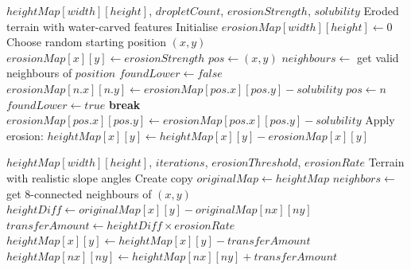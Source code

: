\documentclass[12pt,a4paper]{report}
\begin{document}
\begin{algorithm}[H]
\footnotesize
\centering
\caption{Hydraulic Erosion Simulation}
\label{alg:hydraulic_erosion}
\begin{algorithmic}[1]
\Require $heightMap[width][height]$, $dropletCount$, $erosionStrength$, $solubility$
\Ensure Eroded terrain with water-carved features
\State Initialise $erosionMap[width][height] \leftarrow 0$
    \State Choose random starting position $(x, y)$
    \State $erosionMap[x][y] \leftarrow erosionStrength$
    \State $pos \leftarrow (x, y)$
        \State $neighbours \leftarrow$ get valid neighbours of $position$
        \State $foundLower \leftarrow false$
                \State $erosionMap[n.x][n.y] \leftarrow erosionMap[pos.x][pos.y] - solubility$
                \State $pos \leftarrow n$
                \State $foundLower \leftarrow true$
                \State \textbf{break}
            \EndIf
        \EndFor
            \State $erosionMap[pos.x][pos.y] \leftarrow erosionMap[pos.x][pos.y] - solubility$
        \EndIf
    \EndWhile
\EndFor
\State Apply erosion: $heightMap[x][y] \leftarrow heightMap[x][y] - erosionMap[x][y]$
\end{algorithmic}
\end{algorithm}



\begin{algorithm}[h]
\footnotesize
\centering
\caption{Thermal Erosion Simulation}
\label{alg:thermal_erosion}
\begin{algorithmic}[1]
\Require $heightMap[width][height]$, $iterations$, $erosionThreshold$, $erosionRate$
\Ensure Terrain with realistic slope angles
    \State Create copy $originalMap \leftarrow heightMap$
            \State $neighbors \leftarrow$ get 8-connected neighbours of $(x, y)$
                    \State $heightDiff \leftarrow originalMap[x][y] - originalMap[nx][ny]$
                        \State $transferAmount \leftarrow heightDiff \times erosionRate$
                        \State $heightMap[x][y] \leftarrow heightMap[x][y] - transferAmount$
                        \State $heightMap[nx][ny] \leftarrow heightMap[nx][ny] + transferAmount$
                    \EndIf
                \EndIf
            \EndFor
        \EndFor
    \EndFor
\EndFor
\end{algorithmic}
\end{algorithm}
\end{document}
